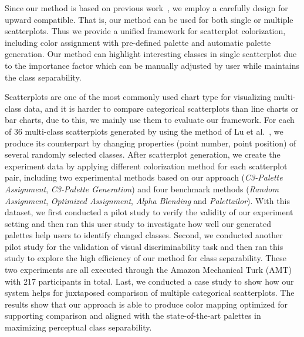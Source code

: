 Since our method is based on previous work~\cite{Wang2018, Lu21}, we employ a carefully design for upward compatible. That is, our method can be used for both single or multiple scatterplots. Thus we provide a unified framework for scatterplot colorization, including color assignment with pre-defined palette and automatic palette generation. Our method can highlight interesting classes in single scatterplot due to the importance factor which can be manually adjusted by user while maintains the class separability.

Scatterplots are one of the most commonly used chart type for visualizing multi-class data, and it is harder to compare categorical scatterplots than line charts or bar charts, due to this, we mainly use them to evaluate our framework. For each of 36 multi-class scatterplots generated by using the method of Lu et al.~\cite{Lu21}, we produce its counterpart by changing properties (point number, point position) of several randomly selected classes. After scatterplot generation, we create the experiment data by applying different colorization method for each scatterplot pair, including two experimental methods based on our approach (\emph{C3-Palette Assignment}, \emph{C3-Palette Generation}) and four benchmark methods (\emph{Random Assignment}, \emph{Optimized Assignment}, \emph{Alpha Blending} and \emph{Palettailor}). With this dataset, we first conducted a pilot study to verify the validity of our experiment setting and then ran this user study to investigate how well our generated palettes help users to identify changed classes.
Second, we conducted another pilot study for the validation of visual discriminability task and then ran this study to explore the high efficiency of our method for class separability.
These two experiments are all executed through the Amazon Mechanical Turk (AMT) with 217 participants in total.
Last, we conducted a case study to show how our system helps for juxtaposed comparison of multiple categorical scatterplots.
The results show that our approach is able to produce color mapping optimized for supporting comparison and aligned with the state-of-the-art palettes in maximizing perceptual class separability.

